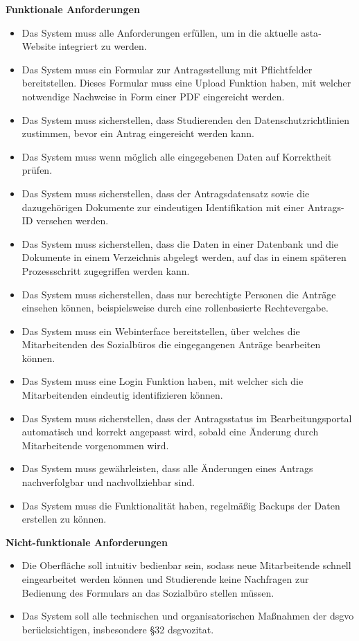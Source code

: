 \textbf{Funktionale Anforderungen}
\begin{itemize}
    \item Das System muss alle Anforderungen erfüllen, um in die aktuelle \gls{asta}-Website integriert zu werden. 
    \item Das System muss ein Formular zur Antragsstellung mit Pflichtfelder bereitstellen. Dieses Formular muss eine Upload Funktion haben, mit welcher notwendige Nachweise in Form einer PDF eingereicht werden. 
    \item Das System muss sicherstellen, dass Studierenden den Datenschutzrichtlinien zustimmen, bevor ein Antrag eingereicht werden kann. 
    \item Das System muss wenn möglich alle eingegebenen Daten auf Korrektheit prüfen. 
    \item Das System muss sicherstellen, dass der Antragsdatensatz sowie die dazugehörigen Dokumente zur eindeutigen Identifikation mit einer Antrags-ID versehen werden. 
    \item Das System muss sicherstellen, dass die Daten in einer Datenbank und die Dokumente in einem Verzeichnis abgelegt werden, auf das in einem späteren Prozessschritt zugegriffen werden kann.
    \item Das System muss sicherstellen, dass nur berechtigte Personen die Anträge einsehen können, beispielsweise durch eine rollenbasierte Rechtevergabe. 
    \item Das System muss ein Webinterface bereitstellen, über welches die Mitarbeitenden des Sozialbüros die eingegangenen Anträge bearbeiten können. 
    \item Das System muss eine Login Funktion haben, mit welcher sich die Mitarbeitenden eindeutig identifizieren können. 
    \item Das System muss sicherstellen, dass der Antragsstatus im Bearbeitungsportal automatisch und korrekt angepasst wird, sobald eine Änderung durch Mitarbeitende vorgenommen wird.
    \item Das System muss gewährleisten, dass alle Änderungen eines Antrags nachverfolgbar und nachvollziehbar sind. 
    \item Das System muss die Funktionalität haben, regelmäßig Backups der Daten erstellen zu können. 
\end{itemize}

\textbf{Nicht-funktionale Anforderungen}
\begin{itemize}
    \item Die Oberfläche soll intuitiv bedienbar sein, sodass neue Mitarbeitende schnell eingearbeitet werden können und Studierende keine Nachfragen zur Bedienung des Formulars an das Sozialbüro stellen müssen. 
    \item Das System soll alle technischen und organisatorischen Maßnahmen der \gls{dsgvo} berücksichtigen, insbesondere §32 \gls{dsgvozitat}.
\end{itemize}

